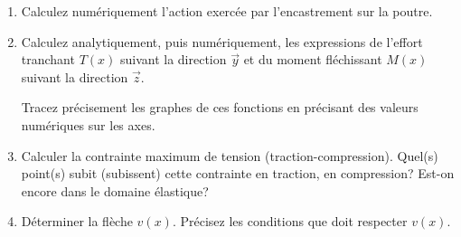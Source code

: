 \documentclass[lecture.tex]{subfiles}
\begin{document}
\begin{enumerate}
  \item Calculez numériquement l'action exercée par l'encastrement sur la poutre.
  \item Calculez analytiquement, puis numériquement, les expressions de l'effort tranchant $T(x)$ suivant la  direction $\vec{y}$ et du moment fléchissant $M(x)$ suivant la direction $\vec{z}$.\par
  Tracez précisement les graphes de ces fonctions en précisant des valeurs numériques sur les axes.
  \item Calculer la contrainte maximum de tension (traction-compression). Quel(s) point(s) subit (subissent) cette contrainte en traction, en compression? Est-on encore dans le domaine élastique?
  \item Déterminer la flèche $v(x)$. Précisez les conditions que doit respecter $v(x)$.
\end{enumerate}

\finexercice
\end{document}
